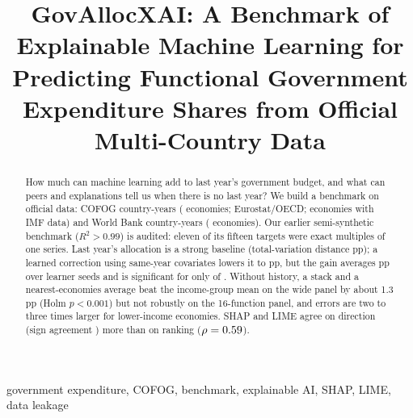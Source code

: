 \documentclass[conference]{IEEEtran}
\DeclareRobustCommand*{\_}{\textunderscore\hskip0pt\relax}
\begin{document}
\title{GovAllocXAI: A Benchmark of Explainable Machine Learning for Predicting Functional Government Expenditure Shares from Official Multi-Country Data}

\author{
}
\maketitle

\begin{abstract}
How much can machine learning add to last year's government budget, and what can peers and explanations tell us when there is no last year? We build a benchmark on official data: \NCofogRows{} COFOG country-years (\NCofogCountries{} economies; Eurostat/OECD; \NTenEcon{} economies with IMF data) and \NWdiRows{} World Bank country-years (\NWdiCountries{} economies). Our earlier semi-synthetic benchmark ($R^2>0.99$) is audited: eleven of its fifteen targets were exact multiples of one series. Last year's allocation is a strong baseline (total-variation distance \ResTVDPersist{} pp); a learned correction using same-year covariates lowers it to \ResTVDHyb{} pp, but the gain averages \AnnSeedMeanGain{} pp over learner seeds and is significant for only \AnnSeedNExcl{} of \AnnSeedN. Without history, a stack and a nearest-economies average beat the income-group mean on the wide panel by about 1.3 pp (Holm $p<0.001$) but not robustly on the 16-function panel, and errors are two to three times larger for lower-income economies. SHAP and LIME agree on direction (sign agreement \AgrSignMean) more than on ranking ($\rho=0.59$).
\end{abstract}
\begin{IEEEkeywords}
government expenditure, COFOG, benchmark, explainable AI, SHAP, LIME, data leakage
\end{IEEEkeywords}
\end{document}
